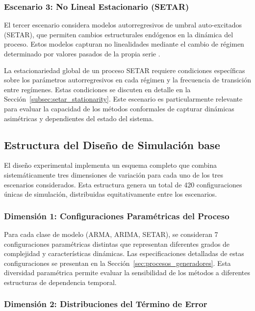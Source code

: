 \subsubsection{Escenario 3: No Lineal Estacionario (SETAR)}

El tercer escenario considera modelos autorregresivos de umbral auto-excitados (SETAR), que permiten cambios estructurales endógenos en la dinámica del proceso. Estos modelos capturan no linealidades mediante el cambio de régimen determinado por valores pasados de la propia serie \parencite{Chen2023}.

La estacionariedad global de un proceso SETAR requiere condiciones específicas sobre los parámetros autorregresivos en cada régimen y la frecuencia de transición entre regímenes. Estas condiciones se discuten en detalle en la Sección~\ref{subsec:setar_stationarity}. Este escenario es particularmente relevante para evaluar la capacidad de los métodos conformales de capturar dinámicas asimétricas y dependientes del estado del sistema.

\subsection{Estructura del Diseño de Simulación base}
\label{subsec:diseño_factorial}

El diseño experimental implementa un esquema completo que combina sistemáticamente tres dimensiones de variación para cada uno de los tres escenarios considerados. Esta estructura genera un total de 420 configuraciones únicas de simulación, distribuidas equitativamente entre los escenarios.

\subsubsection{Dimensión 1: Configuraciones Paramétricas del Proceso}

Para cada clase de modelo (ARMA, ARIMA, SETAR), se consideran 7 configuraciones paramétricas distintas que representan diferentes grados de complejidad y características dinámicas. Las especificaciones detalladas de estas configuraciones se presentan en la Sección~\ref{sec:procesos_generadores}. Esta diversidad paramétrica permite evaluar la sensibilidad de los métodos a diferentes estructuras de dependencia temporal.

\subsubsection{Dimensión 2: Distribuciones del Término de Error}

